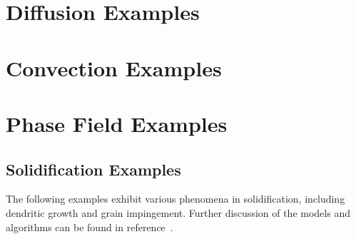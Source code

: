 \documentclass[letterpaper]{book}
\begin{document}
\renewcommand{\ptctitle}{Example Contents}
\parttoc

\chapter{Diffusion Examples}


% 


% 

% 




\chapter{Convection Examples}


% 

% 
% 

\chapter{Phase Field Examples}

\section*{Solidification Examples}

The following examples exhibit various phenomena in solidification, including
dendritic growth and grain impingement.  Further discussion of the
models and algorithms can be found in
reference~\cite{WarrenPolycrystal}.
\end{document}
